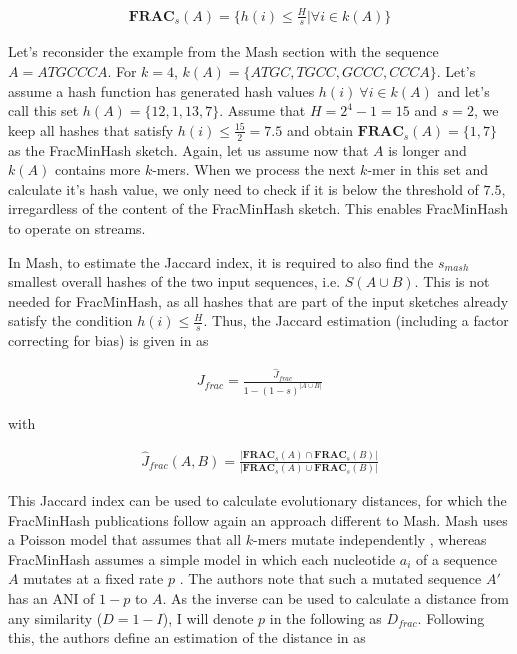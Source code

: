 \begin{align}
  \mathbf{FRAC}_s(A) = \{h(i) \leq \frac{H}{s} | \forall i \in k(A)\}
\end{align}

Let's reconsider the example from the Mash section with the sequence
$A=ATGCCCA$. For $k=4$, $k(A) = \{ATGC, TGCC, GCCC, CCCA\}$. Let's assume a hash
function has generated hash values $h(i)~\forall i \in k(A)$ and let's call this
set $h(A) = \{12, 1, 13, 7\}$. Assume that $H=2^4-1=15$ and $s=2$, we keep all
hashes that satisfy $h(i) \leq \frac{15}{2}=7.5$ and obtain $\mathbf{FRAC}_s(A)
= \{1, 7\}$ as the FracMinHash sketch. Again, let us assume now that $A$ is
longer and $k(A)$ contains more $k$-mers. When we process the next $k$-mer in
this set and calculate it's hash value, we only need to check if it is below the
threshold of $7.5$, irregardless of the content of the FracMinHash sketch. This
enables FracMinHash to operate on streams.

In Mash, to estimate the Jaccard index, it is required to also find the
$s_{mash}$ smallest overall hashes of the two input sequences, i.e. $S(A \cup
B)$. This is not needed for FracMinHash, as all hashes that are part of the
input sketches already satisfy the condition $h(i) \leq \frac{H}{s}$. Thus, the
Jaccard estimation (including a factor correcting for bias) is given in
\cite{heraDerivingConfidenceIntervals2023} as

\begin{align}
  J_{frac} = \frac{\hat{J}_{frac}}{1 - (1 - s)^{|A \cup B|}}
\end{align}

with

\begin{align}
  \hat{J}_{frac}(A, B) = \frac{|\mathbf{FRAC}_s(A) \cap \mathbf{FRAC}_s(B)|}{|\mathbf{FRAC}_s(A) \cup \mathbf{FRAC}_s(B)|}  
\end{align}

This Jaccard index can be used to calculate evolutionary distances, for which
the FracMinHash publications follow again an approach different to Mash. Mash
uses a Poisson model that assumes that all $k$-mers mutate independently
\cite{ondovMashFastGenome2016,heraDerivingConfidenceIntervals2023,fanAssemblyAlignmentfreeMethod2015},
whereas FracMinHash assumes a simple model in which each nucleotide $a_i$ of a
sequence $A$ mutates at a fixed rate $p$
\cite{heraDerivingConfidenceIntervals2023}. The authors note that such a mutated
sequence $A'$ has an ANI of $1-p$ to $A$. As the inverse can be used to
calculate a distance from any similarity ($D = 1 - I$), I will denote $p$ in the
following as $D_{frac}$. Following this, the authors define an estimation of the
distance in \cite{heraDerivingConfidenceIntervals2023} as

